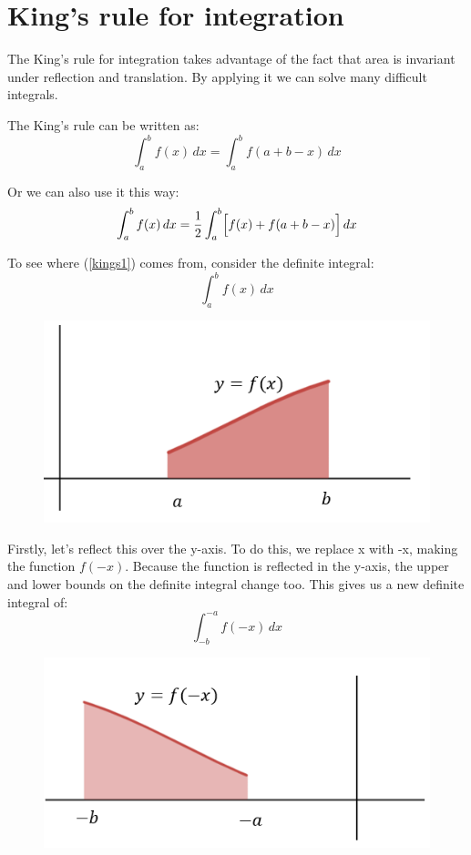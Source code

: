 \documentclass[../main.tex]{subfiles}
\begin{document}
\section{King's rule for integration}
The King's rule for integration takes advantage of the fact that area is invariant under reflection and translation. By applying it we can solve many difficult integrals.

The King's rule can be written as:
\begin{equation}\label{kings1}
    \int_{a}^{b} f(x)\,dx = \int_{a}^{b} f(a+b-x)\, dx
\end{equation}

Or we can also use it this way:
\begin{equation}\label{kings2}
    \int_{a}^{b} f(x)\,dx = \frac{1}{2}\int_{a}^{b} \Bigl[f(x) + f(a+b-x)\Bigl]\, dx
\end{equation}

To see where (\ref{kings1}) comes from, consider the definite integral:
\[\int_{a}^{b} f(x)\,dx\]

\begin{figure}[h]
    \centering
    \includegraphics{images/kingsrule1.png}
\end{figure}

Firstly, let's reflect this over the y-axis. To do this, we replace {x} with {-x}, making the function $f(-x)$. Because the function is reflected in the y-axis, the upper and lower bounds on the definite integral change too. This gives us a new definite integral of:
\[\int_{-b}^{-a} f(-x)\,dx\]

\begin{figure}[h]
    \centering
    \includegraphics{images/kingsrule2.png}
\end{figure}
\end{document}
